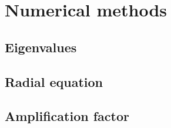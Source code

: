 
\chapter{Numerical methods} %
\label{Chapter4}


\section{Eigenvalues}

\section{Radial equation}

\section{Amplification factor}


\cleardoublepage